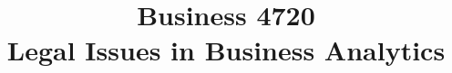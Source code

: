 \documentclass{article}
\title{Business 4720\\ \vspace{\baselineskip}
Legal Issues in Business Analytics}
\begin{document}
\maketitle

\vfill

\clearpage


\end{document}
